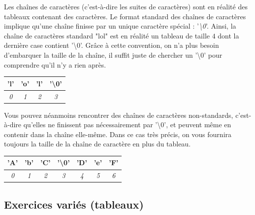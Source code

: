 \documentclass[11pt,a4paper]{article}
\begin{document}
\bigskip

Les chaînes de caractères (c'est-à-dire les suites de caractères) sont en réalité des tableaux contenant des caractères.
Le format standard des chaînes de caractères implique qu'une chaîne finisse par un unique caractère spécial : '\textit{\textbackslash 0}'.
Ainsi, la chaîne de caractères standard "lol" est en réalité un tableau de taille $ 4 $ dont la dernière case contient '\textbackslash 0'.
Grâce à cette convention, on n'a plus besoin d'embarquer la taille de la chaîne, il suffit juste de chercher un '\textbackslash 0' pour comprendre qu'il n'y a rien après.

\bigskip

\begin{table}[h!]
  \centering
  \begin{tabular}{| c | c | c | c |}
  \hline
'l' & 'o' & 'l' & '\textbackslash 0' \\
  \hline
\textit{0} & \textit{1} & \textit{2} & \textit{3} \\
  \hline
  \end{tabular}
\end{table}

\bigskip

Vous pouvez néanmoins rencontrer des chaînes de caractères non-standards, c'est-à-dire qu'elles ne finissent pas nécessairement par '\textbackslash 0', et peuvent même en contenir dans la chaîne elle-même.
Dans ce cas très précis, on vous fournira toujours la taille de la chaîne de caractère en plus du tableau.

\bigskip

\begin{table}[h!]
  \centering
  \begin{tabular}{| c | c | c | c | c | c | c |}
  \hline
'A' & 'b' & 'C' & '\textbackslash 0' & 'D' & 'e' & 'F' \\
  \hline
\textit{0} & \textit{1} & \textit{2} & \textit{3} & \textit{4} & \textit{5} & \textit{6} \\
  \hline
  \end{tabular}
\end{table}

\clearpage

\subsection{Exercices variés (tableaux)}
\end{document}
